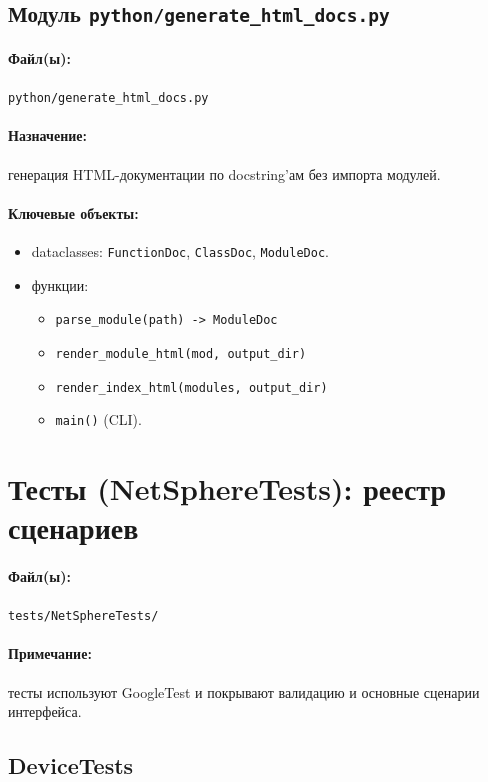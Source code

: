 \documentclass[14pt,a4paper]{extarticle}
\begin{document}
\subsection{Модуль \texttt{python/generate\_html\_docs.py}}
\paragraph{Файл(ы):} \texttt{python/generate\_html\_docs.py}
\paragraph{Назначение:} генерация HTML-документации по docstring'ам без импорта модулей.
\paragraph{Ключевые объекты:}
\begin{itemize}
  \item dataclasses: \texttt{FunctionDoc}, \texttt{ClassDoc}, \texttt{ModuleDoc}.
  \item функции:
  \begin{itemize}
    \item \texttt{parse\_module(path) -> ModuleDoc}
    \item \texttt{render\_module\_html(mod, output\_dir)}
    \item \texttt{render\_index\_html(modules, output\_dir)}
    \item \texttt{main()} (CLI).
  \end{itemize}
\end{itemize}

\section{Тесты (NetSphereTests): реестр сценариев}
\paragraph{Файл(ы):} \texttt{tests/NetSphereTests/}
\paragraph{Примечание:} тесты используют GoogleTest и покрывают валидацию и основные сценарии интерфейса.

\subsection{DeviceTests}
\end{document}
